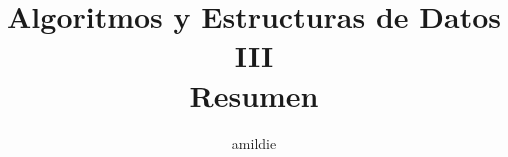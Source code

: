 \documentclass[10pt, a4paper]{article}
\title{Algoritmos y Estructuras de Datos III\\Resumen}
\author{amildie}
\date{\vspace{-5ex}}
\begin{document}
\renewcommand*\contentsname{\empty}

\maketitle
\tableofcontents














\end{document}
